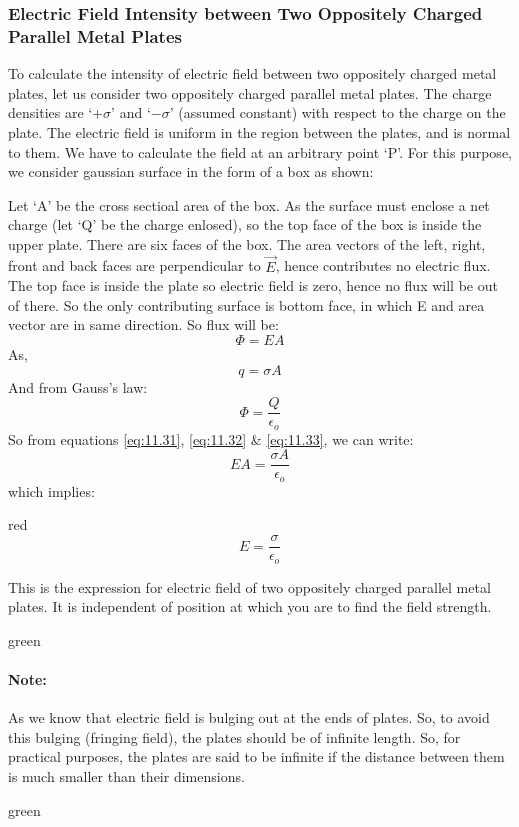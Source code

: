 \subsubsection{Electric Field Intensity between Two Oppositely Charged Parallel Metal Plates}
To calculate the intensity of electric field between two oppositely
charged metal plates, let us consider two oppositely charged parallel
metal plates. The charge densities are ‘$+\sigma$’ and ‘$-\sigma$’ (assumed constant)
with respect to the charge on the plate. The electric field is uniform
in the region between the plates, and is normal to them.
We have to calculate the field at an arbitrary point ‘P’.
For this purpose, we consider gaussian surface in the form of a box
as shown:

Let ‘A’ be the cross sectioal area of the box. As the surface
must enclose a net charge (let ‘Q’ be the charge enlosed),
so the top face of the box is inside the upper plate.
There are six faces of the box. The area vectors of the left, right,
front and back faces are perpendicular to $\vec{E}$, hence contributes
no electric flux. The top face is inside the plate so electric field is
zero, hence no flux will be out of there. So the only contributing surface
is bottom face, in which E and area vector are in same direction.
So flux will be:
\begin{equation}\label{eq:11.31}
  \Phi = EA 
\end{equation}
As, 
\begin{equation}\label{eq:11.32}
  q = \sigma A
\end{equation}
And from Gauss’s law:
\begin{equation}\label{eq:11.33}
  \Phi = \frac{Q}{\epsilon_{o}}
\end{equation}
So from equations \ref{eq:11.31}, \ref{eq:11.32} \& \ref{eq:11.33}, we can
write:
\begin{equation}
  EA = \frac{\sigma A}{\epsilon_{o}} \nonumber
\end{equation}
which implies:
\begin{mybox}{red}{}
\begin{equation}\label{eq:11.34}
  E = \frac{\sigma}{\epsilon_{o}}
\end{equation}
\end{mybox}
This is the expression for electric field of two oppositely charged
parallel metal plates. It is independent of position at which you
are to find the field strength.
\begin{mybox}{green}{}
\paragraph{Note:}
As we know that electric field is bulging out at the ends of plates.
So, to avoid this bulging (fringing field),
the plates should be of infinite length. So, for practical purposes,
the plates are said to be infinite if the distance between them is
much smaller than their dimensions. 
\end{mybox}{green}{}


